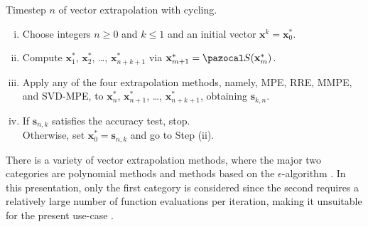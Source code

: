 \begin{framedbox}[htbp]
  \caption{Timestep \(n\) of vector extrapolation with cycling.}
  \label{box:vector_extrapolation_cycling}
  \begin{center}
    \begin{minipage}{0.9\textwidth}
    \begin{enumerate}[(i)]
    \item Choose integers \(n\geq 0\) and \(k\leq 1\) and an initial vector \(\mathbf x^k =\mathbf x^*_0\).
    \item Compute \(\mathbf x^*_1\), \(\mathbf x^*_2\), \dots, \(\mathbf x^*_{n+k+1}\) via \(\mathbf x^*_{m+1} = \pazocal S(\mathbf x^*_m)\).
    \item Apply any of the four extrapolation methods, namely, MPE, RRE, MMPE, and SVD-MPE, to \(\mathbf x^*_n\), \(\mathbf x^*_{n+1}\), \dots, \(\mathbf x^*_{n+k+1}\), obtaining \(\mathbf s_{k,n}\).
    \item If \(\mathbf s_{n,k}\) satisfies the accuracy test, stop.\\
    Otherwise, set \(\mathbf x^*_0=\mathbf s_{n,k}\) and go to Step (ii).
    \end{enumerate}
    \end{minipage}
  \end{center}
\end{framedbox}

There is a variety of vector extrapolation methods, where the major two categories are polynomial methods and methods based on the \(\epsilon\)-algorithm \citep{brezinski_extrapolation_2013, sidi_vector_2017}.
In this presentation, only the first category is considered since the second requires a relatively large number of function evaluations per iteration, making it unsuitable for the present use-case \citep{sidi_vector_2017}.

